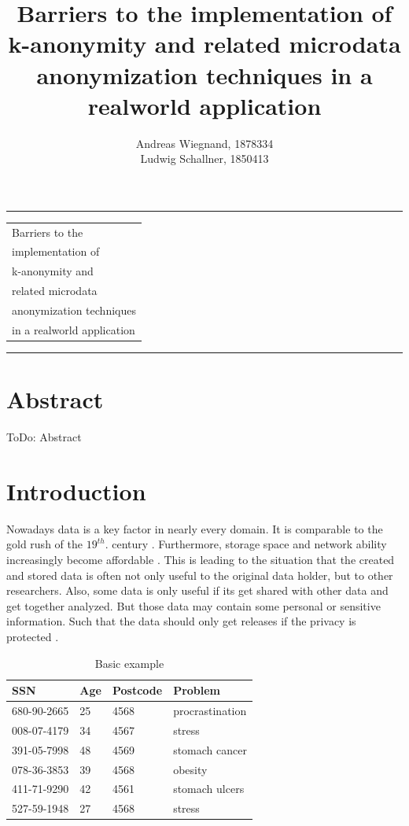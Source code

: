 \documentclass{llncs}
\begin{document}
\thispagestyle{empty}
\rule{\textwidth}{1pt}
\vspace{2pt}
\begin{flushright}
\Huge
\begin{tabular}{@{}l}
Barriers to the\\
implementation of\\
k-anonymity and\\
related microdata\\
anonymization techniques\\
in a realworld application\\[6pt]

\end{tabular}
\end{flushright}
\rule{\textwidth}{1pt}
\vfill
\title{Barriers to the implementation of k-anonymity and related microdata anonymization techniques in a realworld application}
\author{Andreas Wiegnand, 1878334\\
	Ludwig Schallner, 1850413}
\institute{}
\maketitle
%
\section*{Abstract}
ToDo: Abstract
\newpage
\setcounter{page}{1}

\section{Introduction}
%
Nowadays data is a key factor in nearly every domain. It is comparable to the gold rush of the \ensuremath{19^{th}.} century \cite{datarevo}. Furthermore, storage space and network ability increasingly become affordable \cite{sweeney2002k}. 
This is leading to the situation that the created and stored data is often not only useful to the original data holder, but to other researchers. Also, some data is only useful if its get shared with other data and get together analyzed. But those data may contain some personal or sensitive information. Such that the data should only get releases if the privacy is protected \cite{li2006achieving}.\\
\begin{table}[]
	\centering
	\caption{Basic example}
	\label{intro_example}
	\begin{tabular}{@{}llll@{}}
		\toprule
		SSN         & Age & Postcode & Problem         \\ \midrule
		680-90-2665 & 25  & 4568     & procrastination \\
		008-07-4179 & 34  & 4567     & stress          \\
		391-05-7998 & 48  & 4569     & stomach cancer  \\
		078-36-3853 & 39  & 4568     & obesity         \\
		411-71-9290 & 42  & 4561     & stomach ulcers  \\
		527-59-1948 & 27  & 4568     & stress          \\ \bottomrule
	\end{tabular}
\end{table}
\end{document}
